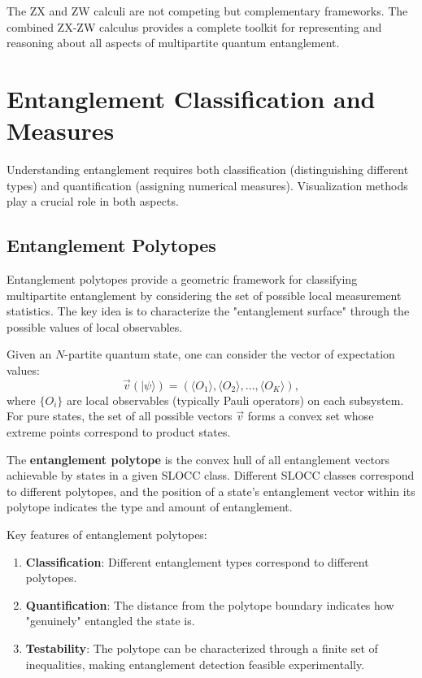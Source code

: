 \documentclass[12pt,a4paper]{article}
\begin{document}
The ZX and ZW calculi are not competing but complementary frameworks. The combined ZX-ZW calculus provides a complete toolkit for representing and reasoning about all aspects of multipartite quantum entanglement.

\section{Entanglement Classification and Measures}
\label{sec:classification}

Understanding entanglement requires both classification (distinguishing different types) and quantification (assigning numerical measures). Visualization methods play a crucial role in both aspects.

\subsection{Entanglement Polytopes}
\label{sec:polytopes}

Entanglement polytopes provide a geometric framework for classifying multipartite entanglement by considering the set of possible local measurement statistics. The key idea is to characterize the "entanglement surface" through the possible values of local observables.

Given an $N$-partite quantum state, one can consider the vector of expectation values:
\begin{equation}
	\vec{v}(|\psi\rangle) = (\langle O_1 \rangle, \langle O_2 \rangle, \ldots, \langle O_K \rangle),
\end{equation}
where $\{O_i\}$ are local observables (typically Pauli operators) on each subsystem. For pure states, the set of all possible vectors $\vec{v}$ forms a convex set whose extreme points correspond to product states.

The \textbf{entanglement polytope} is the convex hull of all entanglement vectors achievable by states in a given SLOCC class. Different SLOCC classes correspond to different polytopes, and the position of a state's entanglement vector within its polytope indicates the type and amount of entanglement.

Key features of entanglement polytopes:
\begin{enumerate}
	\item \textbf{Classification}: Different entanglement types correspond to different polytopes.
	\item \textbf{Quantification}: The distance from the polytope boundary indicates how "genuinely" entangled the state is.
	\item \textbf{Testability}: The polytope can be characterized through a finite set of inequalities, making entanglement detection feasible experimentally.
\end{enumerate}
\end{document}
